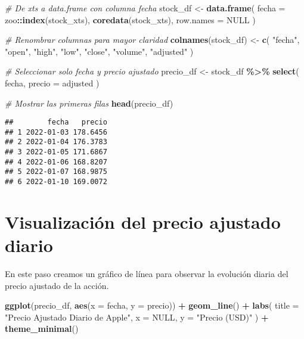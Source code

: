 \documentclass[
  11pt,
]{book}
\newenvironment{Shaded}{\begin{snugshade}}{\end{snugshade}}
\newcommand{\AttributeTok}[1]{\textcolor[rgb]{0.13,0.29,0.53}{#1}}
\newcommand{\CommentTok}[1]{\textcolor[rgb]{0.56,0.35,0.01}{\textit{#1}}}
\newcommand{\ConstantTok}[1]{\textcolor[rgb]{0.56,0.35,0.01}{#1}}
\newcommand{\FunctionTok}[1]{\textcolor[rgb]{0.13,0.29,0.53}{\textbf{#1}}}
\newcommand{\NormalTok}[1]{#1}
\newcommand{\OtherTok}[1]{\textcolor[rgb]{0.56,0.35,0.01}{#1}}
\newcommand{\SpecialCharTok}[1]{\textcolor[rgb]{0.81,0.36,0.00}{\textbf{#1}}}
\newcommand{\StringTok}[1]{\textcolor[rgb]{0.31,0.60,0.02}{#1}}
\begin{document}
\begin{Shaded}
\begin{Highlighting}[]
\CommentTok{\# De xts a data.frame con columna \textquotesingle{}fecha\textquotesingle{}}
\NormalTok{stock\_df }\OtherTok{\textless{}{-}} \FunctionTok{data.frame}\NormalTok{(}
  \AttributeTok{fecha =}\NormalTok{ zoo}\SpecialCharTok{::}\FunctionTok{index}\NormalTok{(stock\_xts),}
  \FunctionTok{coredata}\NormalTok{(stock\_xts),}
  \AttributeTok{row.names =} \ConstantTok{NULL}
\NormalTok{)}

\CommentTok{\# Renombrar columnas para mayor claridad}
\FunctionTok{colnames}\NormalTok{(stock\_df) }\OtherTok{\textless{}{-}} \FunctionTok{c}\NormalTok{(}
  \StringTok{"fecha"}\NormalTok{,}
  \StringTok{"open"}\NormalTok{, }\StringTok{"high"}\NormalTok{, }\StringTok{"low"}\NormalTok{, }\StringTok{"close"}\NormalTok{, }\StringTok{"volume"}\NormalTok{, }\StringTok{"adjusted"}
\NormalTok{)}

\CommentTok{\# Seleccionar solo fecha y precio ajustado}
\NormalTok{precio\_df }\OtherTok{\textless{}{-}}\NormalTok{ stock\_df }\SpecialCharTok{\%\textgreater{}\%}
  \FunctionTok{select}\NormalTok{(}
\NormalTok{    fecha,}
    \AttributeTok{precio =}\NormalTok{ adjusted}
\NormalTok{  )}

\CommentTok{\# Mostrar las primeras filas}
\FunctionTok{head}\NormalTok{(precio\_df)}
\end{Highlighting}
\end{Shaded}

\begin{verbatim}
##        fecha   precio
## 1 2022-01-03 178.6456
## 2 2022-01-04 176.3783
## 3 2022-01-05 171.6867
## 4 2022-01-06 168.8207
## 5 2022-01-07 168.9875
## 6 2022-01-10 169.0072
\end{verbatim}

\section{Visualización del precio ajustado diario}\label{visualizaciuxf3n-del-precio-ajustado-diario}

En este paso creamos un gráfico de línea para observar la evolución diaria del precio ajustado de la acción.

\begin{Shaded}
\begin{Highlighting}[]
\FunctionTok{ggplot}\NormalTok{(precio\_df, }\FunctionTok{aes}\NormalTok{(}\AttributeTok{x =}\NormalTok{ fecha, }\AttributeTok{y =}\NormalTok{ precio)) }\SpecialCharTok{+}
  \FunctionTok{geom\_line}\NormalTok{() }\SpecialCharTok{+}
  \FunctionTok{labs}\NormalTok{(}
    \AttributeTok{title =} \StringTok{"Precio Ajustado Diario de Apple"}\NormalTok{,}
    \AttributeTok{x     =} \ConstantTok{NULL}\NormalTok{,}
    \AttributeTok{y     =} \StringTok{"Precio (USD)"}
\NormalTok{  ) }\SpecialCharTok{+}
  \FunctionTok{theme\_minimal}\NormalTok{()}
\end{Highlighting}
\end{Shaded}
\end{document}
